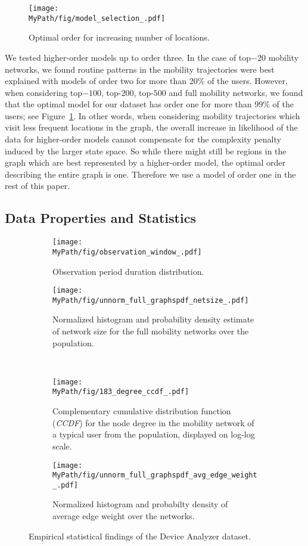 \begin{figure}[!htp]
	\centering
	\texttt{[image: \\MyPath/fig/model\_selection\_.pdf]}
	\caption{{Optimal order for increasing number of locations.}}
	\label{fig:model_selection}
\end{figure}

We tested higher-order models up to order three.
In the case of top$-20$ mobility networks, we found routine patterns in the mobility trajectories were best explained with models of order two for more than 20$\%$ of the users.
However, when considering top$-100$, top-$200$, top-$500$ and full mobility networks, we found that the optimal model for our dataset has order one for more than $ 99\% $ of the users; see Figure~\ref{fig:model_selection}.
In other words, when considering mobility trajectories which visit less frequent locations in the graph, the overall increase in likelihood of the data for higher-order models cannot compensate for the complexity penalty induced by the larger state space.
So while there might still be regions in the graph which are best represented by a higher-order model, the optimal order describing the entire graph is one.
Therefore we use a model of order one in the rest of this paper.

\subsection{Data Properties and Statistics \label{sec:data-stats}}

\begin{figure*}[t]
	\centering
	\begin{subfigure}[t]{0.475\textwidth}
		\centering		\texttt{[image: \\MyPath/fig/observation\_window\_.pdf]}
		\caption{{Observation period duration distribution.}}
		\label{fig:num_of_days}
	\end{subfigure}%
	\begin{subfigure}[t]{.475\textwidth}
		\centering
		\texttt{[image: \\MyPath/fig/unnorm\_full\_graphspdf\_netsize\_.pdf]}
		\caption{{Normalized histogram and probability density estimate of network size for the full mobility networks over the population.}}
		\label{fig:sizes}
	\end{subfigure}%
	\\
	\begin{subfigure}[t]{0.475\textwidth}
		\centering
		\texttt{[image: \\MyPath/fig/183\_degree\_ccdf\_.pdf]}
		\caption{{Complementary cumulative distribution function (\emph{CCDF}) for the node degree in the mobility network of a typical user from the population, displayed on  log-log scale.}}
		\label{fig:ccdf}
	\end{subfigure}
	\begin{subfigure}[t]{0.475\textwidth}
		\centering
		\texttt{[image: \\MyPath/fig/unnorm\_full\_graphspdf\_avg\_edge\_weight\_.pdf]}
		\caption{{Normalized histogram and probabilty density of average edge weight over the networks.}}
		\label{fig:avg_edge_weight}
	\end{subfigure}
	\caption{{Empirical statistical findings of the Device Analyzer dataset.}}
	\label{fig:eda}
\end{figure*}

